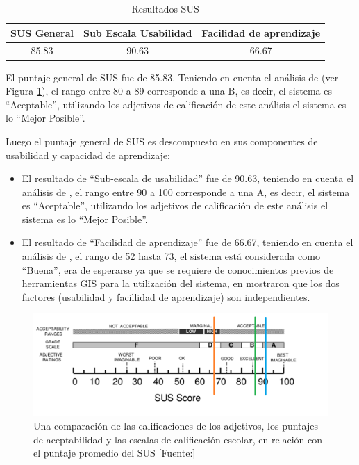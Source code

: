 \begin{table}[]
\caption{Resultados SUS}
\label{tabla:SUSResultado}
\centering
\begin{tabular}{|c|c|c|}
\hline
SUS General & Sub Escala Usabilidad & Facilidad de aprendizaje \\ \hline
85.83             & 90.63                & 66.67                       \\ \hline
\end{tabular}
\end{table}

El puntaje general de SUS fue de 85.83. Teniendo en cuenta el análisis de \cite{Bangor2009DeterminingScale} (ver Figura \ref{fig:susScore}), el rango entre 80 a 89 corresponde a una B, es decir, el sistema es ``Aceptable'', utilizando los adjetivos de calificación de este análisis el sistema es lo ``Mejor Posible''.

Luego el puntaje general de SUS es descompuesto en sus componentes de usabilidad y capacidad de aprendizaje:
\begin{itemize}
    \item El resultado de ``Sub-escala de usabilidad'' fue de 90.63, teniendo en cuenta el análisis de \cite{Bangor2009DeterminingScale}, el rango entre 90 a 100 corresponde a una A, es decir, el sistema es ``Aceptable'', utilizando los adjetivos de calificación de este análisis el sistema es lo ``Mejor Posible''.
    \item El resultado de ``Facilidad de aprendizaje'' fue de 66.67, teniendo en cuenta el análisis de \cite{Bangor2009DeterminingScale}, el rango de 52 hasta 73, el sistema está considerada como ``Buena'', era de esperarse ya que se requiere de conocimientos previos de herramientas GIS para la utilización del sistema, en \citep{Borsci2009OnModels} mostraron que los dos factores (usabilidad y facillidad de aprendizaje) son independientes. 
\end{itemize}{}


\begin{figure}[]
    \centering
    \includegraphics[width=\textwidth]{SUS_resultados.png}
    \caption{Una comparación de las calificaciones de los adjetivos, los puntajes de aceptabilidad y las escalas de calificación escolar, en relación con el puntaje promedio del SUS [Fuente:\citep{Bangor2009DeterminingScale}]}
    \label{fig:susScore}
\end{figure}
